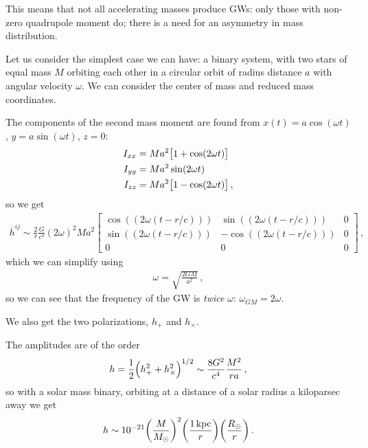 \documentclass[main.tex]{subfiles}
\begin{document}
This means that not all accelerating masses produce GWs: only those with non-zero quadrupole moment do; there is a need for an asymmetry in mass distribution.

Let us consider the simplest case we can have: a binary system, with two stars of equal mass \(M\) orbiting each other in a circular orbit of radius distance \(a\) with angular velocity \(\omega \). We can consider the center of mass and reduced mass coordinates. 

The components of the second mass moment are found from \(x(t) = a \cos(\omega t)\), \(y = a \sin( \omega t)\), \(z = 0\): 
%
\begin{subequations}
\begin{align}
I_{xx} &= Ma^2 \qty[1 + \cos(2 \omega t)] \\
I_{yy} &= Ma^2 \sin(2 \omega t) \\
I_{zz} &= Ma^2 \qty[1 - \cos(2 \omega t)] 
\,,
\end{align}
\end{subequations}
%
so we get 
%
\begin{subequations}
\begin{align}
\overline{h}^{ij} \sim \frac{2}{r} \frac{G}{c^{4}} (2 \omega )^2  M a^2
\left[\begin{array}{ccc}
\cos((2 \omega (t - r/c))) & \sin((2 \omega (t - r/c))) & 0 \\ 
\sin((2 \omega (t - r/c))) & -\cos((2 \omega (t - r/c))) & 0 \\ 
0 & 0 & 0
\end{array}\right]
\,,
\end{align}
\end{subequations}
%
which we can simplify using 
%
\begin{align}
\omega = \sqrt{\frac{2GM}{a^2}}
\,,
\end{align}
%
so we can see that the frequency of the GW is \emph{twice} \(\omega \): \(\omega_{GM} = 2 \omega  \). 

We also get the two polarizations, \(h_{+}\) and \(h_{ \times }\).

The amplitudes are of the order 
%
\begin{align}
h = \frac{1}{2} \qty(h_{+}^2 + h_{ \times }^2)^{1/2} \sim \frac{8 G^2}{c^{4}} \frac{M^2}{ra}
\,,
\end{align}
%
so with a solar mass binary, orbiting at a distance of a solar radius a kiloparsec away we get 
%
\begin{align}
h \sim \num{e-21} \qty(\frac{M}{M_{\odot}})^2 \qty(\frac{\SI{1}{kpc}}{r}) \qty(\frac{R_{\odot}}{r})
\,.
\end{align}
\end{document}
